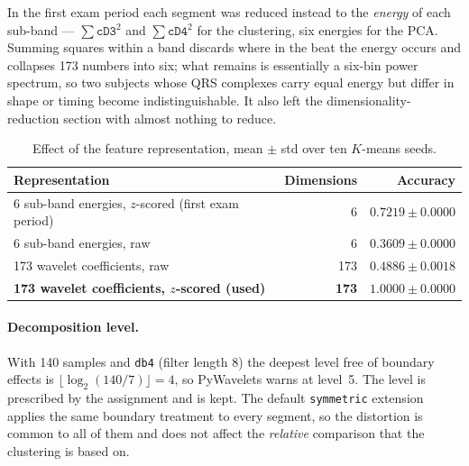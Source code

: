 \documentclass[11pt,a4paper]{article}
\newcommand{\num}[1]{#1}
\newcommand{\change}[1]{\textcolor{black!70}{\textsf{\footnotesize #1}}}
\begin{document}
In the first exam period each segment was reduced instead to the \emph{energy} of each
sub-band --- $\sum \texttt{cD3}^2$ and $\sum \texttt{cD4}^2$ for the clustering, six energies
for the PCA. Summing squares within a band discards where in the beat the energy occurs and
collapses \num{173} numbers into six; what remains is essentially a six-bin power spectrum, so
two subjects whose QRS complexes carry equal energy but differ in shape or timing become
indistinguishable. It also left the dimensionality-reduction section with almost nothing to
reduce.

\begin{table}[htbp]
\centering\small
\caption{Effect of the feature representation, mean $\pm$ std over ten $K$-means seeds.}
\label{tab:p1feat}
\begin{tabular}{lrr}
\toprule
Representation & Dimensions & Accuracy \\
\midrule
6 sub-band energies, $z$-scored \change{(first exam period)} & 6 & $0.7219 \pm 0.0000$ \\
6 sub-band energies, raw                                     & 6 & $0.3609 \pm 0.0000$ \\
173 wavelet coefficients, raw                                & 173 & $0.4886 \pm 0.0018$ \\
\textbf{173 wavelet coefficients, $z$-scored (used)}         & \textbf{173} & $\mathbf{1.0000 \pm 0.0000}$ \\
\bottomrule
\end{tabular}
\end{table}

\paragraph{Decomposition level.} With \num{140} samples and \texttt{db4} (filter length 8) the
deepest level free of boundary effects is $\lfloor\log_2(140/7)\rfloor = 4$, so PyWavelets
warns at level~5. The level is prescribed by the assignment and is kept. The default
\texttt{symmetric} extension applies the same boundary treatment to every segment, so the
distortion is common to all of them and does not affect the \emph{relative} comparison that
the clustering is based on.
\end{document}
